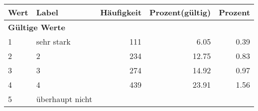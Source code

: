      \begin{longtable}{lXrrr}
     \toprule
     \textbf{Wert} & \textbf{Label} & \textbf{Häufigkeit} & \textbf{Prozent(gültig)} & \textbf{Prozent} \\
     \endhead
     \midrule
     \multicolumn{5}{l}{\textbf{Gültige Werte}}\\

     1 &
     \multicolumn{1}{X}{ sehr stark   } &


       \num{111} &
       \num[round-mode=places,round-precision=2]{6,05} &
         \num[round-mode=places,round-precision=2]{0,39} \\

     2 &
     \multicolumn{1}{X}{ 2   } &


       \num{234} &
       \num[round-mode=places,round-precision=2]{12,75} &
         \num[round-mode=places,round-precision=2]{0,83} \\

     3 &
     \multicolumn{1}{X}{ 3   } &


       \num{274} &
       \num[round-mode=places,round-precision=2]{14,92} &
         \num[round-mode=places,round-precision=2]{0,97} \\

     4 &
     \multicolumn{1}{X}{ 4   } &


       \num{439} &
       \num[round-mode=places,round-precision=2]{23,91} &
         \num[round-mode=places,round-precision=2]{1,56} \\

     5 &
     \multicolumn{1}{X}{ überhaupt nicht   } &



\end{longtable}
